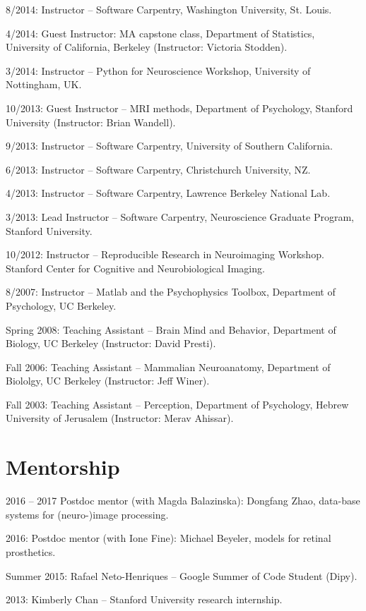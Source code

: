 \documentclass[11pt,fullpage]{article}
\begin{document}
8/2014: Instructor -- Software Carpentry, Washington University, St. Louis.

4/2014: Guest Instructor: MA capstone class, Department of Statistics, University of California, Berkeley (Instructor: Victoria Stodden).

3/2014: Instructor -- Python for Neuroscience Workshop, University of Nottingham, UK.

10/2013: Guest Instructor -- MRI methods, Department of Psychology, Stanford University (Instructor: Brian Wandell).

9/2013: Instructor -- Software Carpentry, University of Southern California.

6/2013: Instructor -- Software Carpentry, Christchurch University, NZ.

4/2013: Instructor -- Software Carpentry, Lawrence Berkeley National Lab.

3/2013: Lead Instructor -- Software Carpentry, Neuroscience Graduate Program, Stanford University.

10/2012: Instructor -- Reproducible Research in Neuroimaging Workshop. Stanford Center for Cognitive and Neurobiological Imaging.

8/2007: Instructor -- Matlab and the Psychophysics Toolbox, Department of Psychology, UC Berkeley.

Spring 2008: Teaching Assistant -- Brain Mind and Behavior, Department of Biology, UC Berkeley (Instructor: David Presti).

Fall 2006: Teaching Assistant -- Mammalian Neuroanatomy, Department of Biololgy, UC Berkeley (Instructor: Jeff Winer).

Fall 2003: Teaching Assistant -- Perception, Department of Psychology, Hebrew University of Jerusalem (Instructor: Merav Ahissar).

\section*{Mentorship}

2016 -- 2017 Postdoc mentor (with Magda Balazinska): Dongfang Zhao, data-base systems for (neuro-)image processing.

2016: Postdoc mentor (with Ione Fine): Michael Beyeler, models for retinal prosthetics.

Summer 2015: Rafael Neto-Henriques -- Google Summer of Code Student (Dipy).

2013: Kimberly Chan -- Stanford University research internship.
\end{document}
